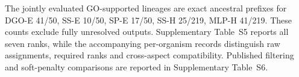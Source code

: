 The jointly evaluated GO-supported lineages are exact ancestral prefixes for DGO-E 41/50, SS-E 10/50, SP-E 17/50, SS-H 25/219, MLP-H 41/219. These counts exclude fully unresolved outputs. Supplementary Table~S5 reports all seven ranks, while the accompanying per-organism records distinguish raw assignments, required ranks and cross-aspect compatibility. Published filtering and soft-penalty comparisons are reported in Supplementary Table~S6.
